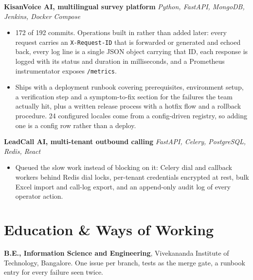 \documentclass[10pt,a4paper]{article}
\begin{document}
\vspace{1pt}
\textbf{KisanVoice AI, multilingual survey platform} \textit{Python, FastAPI, MongoDB, Jenkins, Docker Compose}
\begin{itemize}
  \item 172 of 192 commits. Operations built in rather than added later: every request carries an
        \texttt{X-Request-ID} that is forwarded or generated and echoed back, every log line is a
        single JSON object carrying that ID, each response is logged with its status and duration in
        milliseconds, and a Prometheus instrumentator exposes \texttt{/metrics}.
  \item Ships with a deployment runbook covering prerequisites, environment setup, a verification
        step and a symptom-to-fix section for the failures the team actually hit, plus a written
        release process with a hotfix flow and a rollback procedure. 24 configured locales come from
        a config-driven registry, so adding one is a config row rather than a deploy.
\end{itemize}

\vspace{1pt}
\textbf{LeadCall AI, multi-tenant outbound calling} \textit{FastAPI, Celery, PostgreSQL, Redis, React}
\begin{itemize}
  \item Queued the slow work instead of blocking on it: Celery dial and callback workers behind
        Redis dial locks, per-tenant credentials encrypted at rest, bulk Excel import and call-log
        export, and an append-only audit log of every operator action.
\end{itemize}

\section{Education \& Ways of Working}
\textbf{B.E., Information Science and Engineering}, Vivekananda Institute of Technology, Bangalore.
One issue per branch, tests as the merge gate, a runbook entry for every failure seen twice.
\end{document}
